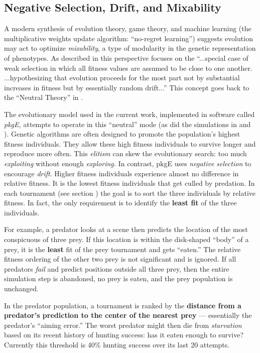 \documentclass[letterpaper]{article}
\newcommand{\jargon}[1]{\textit{#1}}
\newcommand{\lazypredator}[0]{pkgE}
\begin{document}
\subsection{Negative Selection, Drift, and Mixability}

A modern synthesis \cite{livnat_sex_2016} of evolution theory, game theory, and machine learning (the multiplicative weights update algorithm: “no-regret learning”) suggests evolution may act to optimize \jargon{mixability}, a type of modularity in the genetic representation of phenotypes. As described in \citet{chastain_multiplicative_2013} this perspective focuses on the “...special case of weak selection in which all fitness values are assumed to be close to one another. ...hypothesizing that evolution proceeds for the most part not by substantial increases in fitness but by essentially random drift...” This concept goes back to the “Neutral Theory” in \citet{kimura_evolutionary_1968}.
\par
The evolutionary model used in the current work, implemented in software called \jargon{\lazypredator{},} attempts to operate in this “neutral” mode (as did the simulations in \citet{reynolds_iec_2011} and \citet{harrington_coevolution_2014}). Genetic algorithms are often designed to promote the population's highest fitness individuals. They allow these high fitness individuals to survive longer and reproduce more often. This \jargon{elitism} can skew the evolutionary search: too much \jargon{exploiting} without enough \jargon{exploring.}  In contrast, \lazypredator{} uses \textit{negative selection} to encourage \jargon{drift}. Higher fitness individuals experience almost no difference in  relative fitness. It is the lowest fitness individuals that get culled by predation. In each tournament (see section ) the goal is to sort the three individuals by relative fitness. In fact, the only requirement is to identify the \textbf{least fit} of the three individuals.
\par 
For example, a predator looks at a scene then predicts the location of the most conspicuous of three prey. If this location is within the disk-shaped “body” of a prey, it is the \textbf{least} fit of the prey tournament and gets “eaten.” The relative fitness ordering of the other two prey is not significant and is ignored. If all predators \jargon{fail} and predict positions outside all three prey, then the entire simulation step is abandoned, no prey is eaten, and the prey population is unchanged.
\par
In the predator population, a tournament is ranked by the \textbf{distance from a predator's prediction to the center of the nearest prey} — essentially the predator's “aiming error.” The worst predator might then die from \jargon{starvation} based on its recent history of hunting success: has it eaten enough to survive? Currently this threshold is 40\% hunting success over its last 20 attempts.
\end{document}
